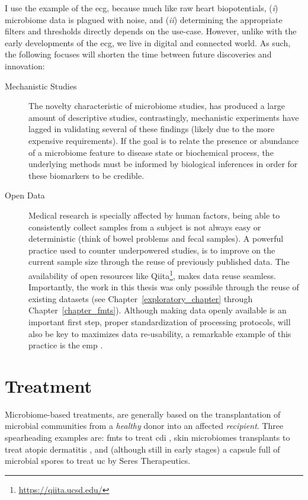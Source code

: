 I use the example of the \gls{ecg}, because much like raw heart biopotentials,
(\textit{i}) microbiome data is plagued with noise, and (\textit{ii})
determining the appropriate filters and thresholds directly depends on the
use-case. However, unlike with the early developments of the \gls{ecg}, we live
in digital and connected world. As such, the following focuses will
shorten the time between future discoveries and innovation:

\begin{description}
    \item[Mechanistic Studies]The novelty characteristic of microbiome studies, 
        has produced a large amount of descriptive studies, contrastingly, 
        mechanistic experiments have lagged in validating several of these 
        findings (likely due to the more expensive requirements).  If the goal 
        is to relate the presence or abundance of a microbiome feature to 
        disease state or biochemical process, the underlying methods must be 
        informed by biological inferences in order for these biomarkers to be 
        credible.

    \item[Open Data]Medical research is specially affected by human factors, 
        being able to consistently collect samples from a subject is not always 
        easy or deterministic (think of bowel problems and fecal samples). A 
        powerful practice used to counter underpowered studies, is to improve 
        on the current sample size through the reuse of previously published 
        data. The availability of open resources like 
        Qiita\footnote{\url{https://qiita.ucsd.edu/}}, makes data reuse 
        seamless. Importantly, the work in this thesis was only possible 
        through the reuse of existing datasets (see 
        Chapter~\ref{exploratory_chapter} through Chapter~\ref{chapter_fmts}).  
        Although making data openly available is an important first step, 
        proper standardization of processing protocols, will also be key to 
        maximizes data re-usability, a remarkable example of this practice is 
        the \gls{emp} \cite{RN4267}.
\end{description}

\section{Treatment}

Microbiome\hyp{}based treatments, are generally based on the transplantation of 
microbial communities from a \textit{healthy} donor into an affected 
\textit{recipient}. Three spearheading examples are: \glspl{fmt} to treat 
\gls{cdi} \cite{RN4129}, skin microbiomes transplants to treat atopic 
dermatitis \cite{GalloSkin}, and (although still in early stages) a capsule 
full of microbial spores to treat \gls{uc} by Seres Therapeutics.

